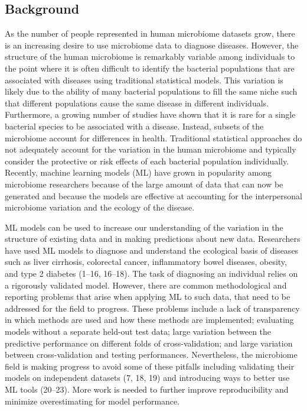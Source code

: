\documentclass[11pt,]{article}
\begin{document}
\newpage

\subsection{Background}\label{background}

As the number of people represented in human microbiome datasets grow,
there is an increasing desire to use microbiome data to diagnose
diseases. However, the structure of the human microbiome is remarkably
variable among individuals to the point where it is often difficult to
identify the bacterial populations that are associated with diseases
using traditional statistical models. This variation is likely due to
the ability of many bacterial populations to fill the same niche such
that different populations cause the same disease in different
individuals. Furthermore, a growing number of studies have shown that it
is rare for a single bacterial species to be associated with a disease.
Instead, subsets of the microbiome account for differences in health.
Traditional statistical approaches do not adequately account for the
variation in the human microbiome and typically consider the protective
or risk effects of each bacterial population individually. Recently,
machine learning models (ML) have grown in popularity among microbiome
researchers because of the large amount of data that can now be
generated and because the models are effective at accounting for the
interpersonal microbiome variation and the ecology of the disease.

ML models can be used to increase our understanding of the variation in
the structure of existing data and in making predictions about new data.
Researchers have used ML models to diagnose and understand the
ecological basis of diseases such as liver cirrhosis, colorectal cancer,
inflammatory bowel diseases, obesity, and type 2 diabetes (1--16,
16--18). The task of diagnosing an individual relies on a rigorously
validated model. However, there are common methodological and reporting
problems that arise when applying ML to such data, that need to be
addressed for the field to progress. These problems include a lack of
transparency in which methods are used and how these methods are
implemented; evaluating models without a separate held-out test data;
large variation between the predictive performance on different folds of
cross-validation; and large variation between cross-validation and
testing performances. Nevertheless, the microbiome field is making
progress to avoid some of these pitfalls including validating their
models on independent datasets (7, 18, 19) and introducing ways to
better use ML tools (20--23). More work is needed to further improve
reproducibility and minimize overestimating for model performance.
\end{document}
